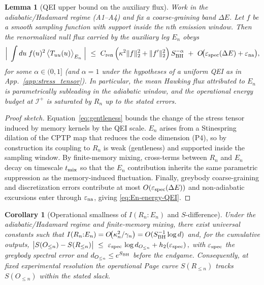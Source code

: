 \documentclass[aps,prd,preprint,onecolumn,superscriptaddress,nofootinbib,longbibliography,floatfix,11pt,showpacs,showkeys]{revtex4-2}
\theoremstyle{plain}
\newtheorem{lemma}[theorem]{Lemma}
\newtheorem{corollary}[theorem]{Corollary}
\theoremstyle{definition}
\theoremstyle{remark}
\begin{document}
\begin{lemma}[QEI upper bound on the auxiliary flux]\label{lem:En-energy-QEI}
Work in the adiabatic/Hadamard regime (A1--A4) and fix a coarse-graining band $\Delta E$. Let $f$ be a smooth sampling function with support inside the $n$th emission window. Then the renormalized null flux carried by the auxiliary leg $E_n$ obeys
\begin{equation}
\label{eq:En-energy-QEI}
\Big|\;\int du\; f(u)^2\,\big\langle T_{uu}(u)\big\rangle_{E_n}\;\Big|
\ \le\
 C_{\rm ren}\,\Big(\kappa^2 \|f\|_2^2 + \|f'\|_2^2\Big)\,S_{\rm BH}^{-\alpha}\ +\ O\!\big(\varepsilon_{\rm spec}(\Delta E)+\varepsilon_{\rm na}\big),
\end{equation}
for some $\alpha\in(0,1]$ (and $\alpha=1$ under the hypotheses of a uniform QEI as in App.~\ref{app:stress_tensor}). In particular, the mean Hawking flux attributed to $E_n$ is parametrically subleading in the adiabatic window, and the operational energy budget at $\mathscr{I}^+$ is saturated by $R_n$ up to the stated errors.
\end{lemma}
\begin{proof}[Proof sketch]
Equation~\eqref{eq:gentleness} bounds the change of the stress tensor induced by memory kernels by the QEI scale. $E_n$ arises from a Stinespring dilation of the CPTP map that reduces the code dimension (P4), so by construction its coupling to $R_n$ is weak (gentleness) and supported inside the sampling window. By finite-memory mixing, cross-terms between $R_n$ and $E_n$ decay on timescale $t_{\rm mix}$ so that the $E_n$ contribution inherits the same parametric suppression as the memory-induced fluctuation. Finally, greybody coarse-graining and discretization errors contribute at most $O(\varepsilon_{\rm spec}(\Delta E))$ and non-adiabatic excursions enter through $\varepsilon_{\rm na}$, giving \eqref{eq:En-energy-QEI}.
\end{proof}


\begin{corollary}[Operational smallness of $I(R_n{:}E_n)$ and $S$-difference]
\label{cor:En-small}
Under the adiabatic/Hadamard regime and finite-memory mixing, there exist universal constants such that
\(
I(R_n{:}E_n)=O\!\big(\kappa_n^2/\gamma_n\big)=O(S_{\rm BH}^{-1}\log d)
\)
and, for the cumulative outputs,
\(
\big|S(O_{\le n})-S(R_{\le n})\big| \ \le\ \varepsilon_{\rm spec}\,\log d_{O_{\le n}}+h_2(\varepsilon_{\rm spec})\,,
\)
with $\varepsilon_{\rm spec}$ the greybody spectral error and $d_{O_{\le n}}\le e^{S_{\rm BH}}$ before the endgame.
Consequently, at fixed experimental resolution the operational Page curve $S(R_{\le n})$ tracks $S(O_{\le n})$ within the stated slack.
\end{corollary}
\end{document}
